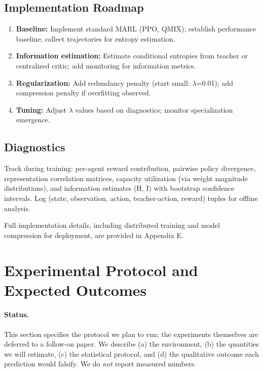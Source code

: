 \documentclass[10pt, letterpaper]{article}
\begin{document}
\subsection{Implementation Roadmap}

\begin{enumerate}
    \item \textbf{Baseline:} Implement standard MARL (PPO, QMIX); establish performance baseline; collect trajectories for entropy estimation.
    \item \textbf{Information estimation:} Estimate conditional entropies from teacher or centralized critic; add monitoring for information metrics.
    \item \textbf{Regularization:} Add redundancy penalty (start small: $\lambda$=0.01); add compression penalty if overfitting observed.
    \item \textbf{Tuning:} Adjust $\lambda$ values based on diagnostics; monitor specialization emergence.
\end{enumerate}

\subsection{Diagnostics}

Track during training: per-agent reward contribution, pairwise policy divergence, representation correlation matrices, capacity utilization (via weight magnitude distributions), and information estimates (H, I) with bootstrap confidence intervals. Log (state, observation, action, teacher-action, reward) tuples for offline analysis.

Full implementation details, including distributed training and model compression for deployment, are provided in Appendix E.

\section{Experimental Protocol and Expected Outcomes}
\label{sec:experiments}

\paragraph{Status.} This section specifies the protocol we plan to run; the experiments themselves are deferred to a follow-on paper. We describe (a) the environment, (b) the quantities we will estimate, (c) the statistical protocol, and (d) the qualitative outcome each prediction would falsify. We do \emph{not} report measured numbers.
\end{document}
